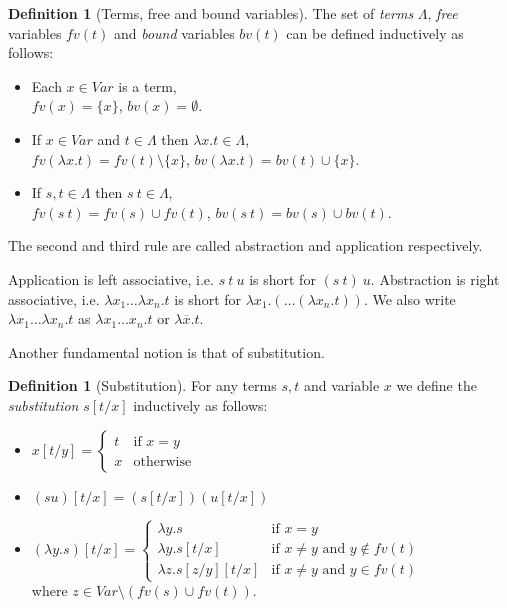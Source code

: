 \documentclass[11pt]{article}
\theoremstyle{definition}
\theoremstyle{definition}
\theoremstyle{definition}
\theoremstyle{definition}
\theoremstyle{definition}
\newtheorem{definition}[theorem]{Definition}
\theoremstyle{definition}
\theoremstyle{definition}
\newcommand{\fv}{\mathit{fv}}
\newcommand{\bv}{\mathit{bv}}
\newcommand{\var}{\mathit{Var}}
\begin{document}
	\begin{definition}[Terms, free and bound variables]
		The set of \emph{terms} $\Lambda$, \emph{free} variables $\fv(t)$ and \emph{bound} variables $\bv(t)$ can be defined inductively as follows:
		\begin{itemize}
			\item Each $x\in \var$ is a term,\\$\fv(x) = \{x\}$, $\bv(x) = \emptyset$.
			\item If $x\in \var$ and $t\in\Lambda$
			then $\lambda x. t\in\Lambda$,\\$\fv(\lambda x. t) = \fv(t)\setminus\{x\}$, $\bv(\lambda x. t) = \bv(t)\cup\{x\}$.
			\item If $s, t\in\Lambda$ then $s\ t\in\Lambda$,\\$\fv(s\ t) = \fv(s)\cup\fv(t)$, $\bv(s\ t) = \bv(s)\cup\bv(t)$.
		\end{itemize}
		The second and third rule are called abstraction and application respectively.
	\end{definition}

	Application is left associative, i.e. $s\ t\ u$ is short for $(s\ t)\ u$.
	Abstraction is right associative, i.e. $\lambda x_1\dots \lambda x_n. t$ is short for $\lambda x_1. (\dots (\lambda x_n. t))$. We also write $\lambda x_1\dots\lambda x_n. t$ as $\lambda x_1\dots x_n. t$ or $\lambda \overline{x}. t$.

	Another fundamental notion is that of substitution.

	\begin{definition}[Substitution]
		For any terms $s, t$ and variable $x$ we define the \emph{substitution} $s[t/x]$ inductively as follows:
		\begin{itemize}
			\item $x[t/y] =\begin{cases}
				t & \text{if } x = y\\
				x & \text{otherwise}
			\end{cases}$
			\item $(s u)[t/x] = (s[t/x])(u[t/x])$
			\item $(\lambda y. s)[t/x] = \begin{cases}
				\lambda y. s & \text{if } x = y\\
				\lambda y. s[t/x] & \text{if } x\neq y \text{ and } y\notin\fv(t)\\
				\lambda z. s[z/y][t/x] & \text{if } x\neq y \text{ and } y\in\fv(t)
			\end{cases}$ \\where $z\in \var\setminus(\fv(s)\cup\fv(t))$.
		\end{itemize}
	\end{definition}
\end{document}
